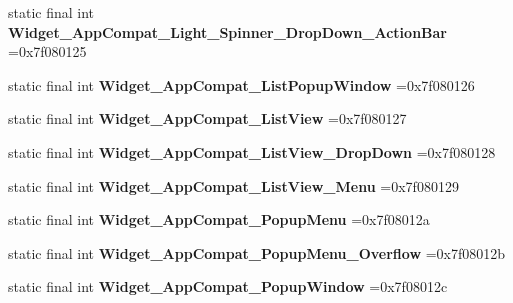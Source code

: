 \begin{DoxyCompactItemize}
\item 
\hypertarget{classcheck_1_1test_1_1_r_1_1style_abd2e3816515a71a23ed866db2211cfb0}{}static final int {\bfseries Widget\+\_\+\+App\+Compat\+\_\+\+Light\+\_\+\+Spinner\+\_\+\+Drop\+Down\+\_\+\+Action\+Bar} =0x7f080125\label{classcheck_1_1test_1_1_r_1_1style_abd2e3816515a71a23ed866db2211cfb0}

\item 
\hypertarget{classcheck_1_1test_1_1_r_1_1style_ab209ee51802bce1625508956e3df8178}{}static final int {\bfseries Widget\+\_\+\+App\+Compat\+\_\+\+List\+Popup\+Window} =0x7f080126\label{classcheck_1_1test_1_1_r_1_1style_ab209ee51802bce1625508956e3df8178}

\item 
\hypertarget{classcheck_1_1test_1_1_r_1_1style_a20da31ddc23f743b9a46e95eba03e34a}{}static final int {\bfseries Widget\+\_\+\+App\+Compat\+\_\+\+List\+View} =0x7f080127\label{classcheck_1_1test_1_1_r_1_1style_a20da31ddc23f743b9a46e95eba03e34a}

\item 
\hypertarget{classcheck_1_1test_1_1_r_1_1style_a462818136ad01a3cddfe9c722579da54}{}static final int {\bfseries Widget\+\_\+\+App\+Compat\+\_\+\+List\+View\+\_\+\+Drop\+Down} =0x7f080128\label{classcheck_1_1test_1_1_r_1_1style_a462818136ad01a3cddfe9c722579da54}

\item 
\hypertarget{classcheck_1_1test_1_1_r_1_1style_a95d9bd7b5cbe38db5d86e75aee82a203}{}static final int {\bfseries Widget\+\_\+\+App\+Compat\+\_\+\+List\+View\+\_\+\+Menu} =0x7f080129\label{classcheck_1_1test_1_1_r_1_1style_a95d9bd7b5cbe38db5d86e75aee82a203}

\item 
\hypertarget{classcheck_1_1test_1_1_r_1_1style_a72d87433b9dd823ebed2d16d3da85176}{}static final int {\bfseries Widget\+\_\+\+App\+Compat\+\_\+\+Popup\+Menu} =0x7f08012a\label{classcheck_1_1test_1_1_r_1_1style_a72d87433b9dd823ebed2d16d3da85176}

\item 
\hypertarget{classcheck_1_1test_1_1_r_1_1style_a2c76739a32775395cfe23b22ac63ae62}{}static final int {\bfseries Widget\+\_\+\+App\+Compat\+\_\+\+Popup\+Menu\+\_\+\+Overflow} =0x7f08012b\label{classcheck_1_1test_1_1_r_1_1style_a2c76739a32775395cfe23b22ac63ae62}

\item 
\hypertarget{classcheck_1_1test_1_1_r_1_1style_ae7c841b86ddcd51bd2a998d5bd172013}{}static final int {\bfseries Widget\+\_\+\+App\+Compat\+\_\+\+Popup\+Window} =0x7f08012c\label{classcheck_1_1test_1_1_r_1_1style_ae7c841b86ddcd51bd2a998d5bd172013}


\end{DoxyCompactItemize}
